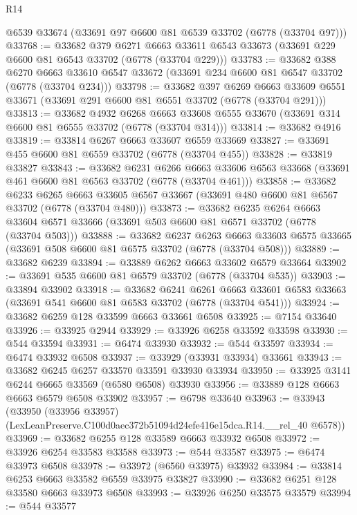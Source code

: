 \begin{lexlean}{R14}
\begin{coremodule}
    @6539
    @33674
    (@33691 @97 @6600 @81 @6539 @33702 (@6778 (@33704 @97)))
@33768 := @33682
    @379
    @6271
    @6663
    @33611
    @6543
    @33673
    (@33691 @229 @6600 @81 @6543 @33702 (@6778 (@33704 @229)))
@33783 := @33682
    @388
    @6270
    @6663
    @33610
    @6547
    @33672
    (@33691 @234 @6600 @81 @6547 @33702 (@6778 (@33704 @234)))
@33798 := @33682
    @397
    @6269
    @6663
    @33609
    @6551
    @33671
    (@33691 @291 @6600 @81 @6551 @33702 (@6778 (@33704 @291)))
@33813 := @33682
    @4932
    @6268
    @6663
    @33608
    @6555
    @33670
    (@33691 @314 @6600 @81 @6555 @33702 (@6778 (@33704 @314)))
@33814 := @33682 @4916
@33819 := @33814 @6267 @6663 @33607 @6559 @33669
@33827 := @33691 @455 @6600 @81 @6559 @33702 (@6778 (@33704 @455))
@33828 := @33819 @33827
@33843 := @33682
    @6231
    @6266
    @6663
    @33606
    @6563
    @33668
    (@33691 @461 @6600 @81 @6563 @33702 (@6778 (@33704 @461)))
@33858 := @33682
    @6233
    @6265
    @6663
    @33605
    @6567
    @33667
    (@33691 @480 @6600 @81 @6567 @33702 (@6778 (@33704 @480)))
@33873 := @33682
    @6235
    @6264
    @6663
    @33604
    @6571
    @33666
    (@33691 @503 @6600 @81 @6571 @33702 (@6778 (@33704 @503)))
@33888 := @33682
    @6237
    @6263
    @6663
    @33603
    @6575
    @33665
    (@33691 @508 @6600 @81 @6575 @33702 (@6778 (@33704 @508)))
@33889 := @33682 @6239
@33894 := @33889 @6262 @6663 @33602 @6579 @33664
@33902 := @33691 @535 @6600 @81 @6579 @33702 (@6778 (@33704 @535))
@33903 := @33894 @33902
@33918 := @33682
    @6241
    @6261
    @6663
    @33601
    @6583
    @33663
    (@33691 @541 @6600 @81 @6583 @33702 (@6778 (@33704 @541)))
@33924 := @33682 @6259 @128 @33599 @6663 @33661 @6508
@33925 := @7154 @33640
@33926 := @33925 @2944
@33929 := @33926 @6258 @33592 @33598
@33930 := @544 @33594
@33931 := @6474 @33930
@33932 := @544 @33597
@33934 := @6474 @33932 @6508
@33937 := @33929 (@33931 @33934) @33661
@33943 := @33682 @6245 @6257 @33570 @33591 @33930 @33934
@33950 := @33925 @3141 @6244 @6665 @33569 (@6580 @6508) @33930
@33956 := @33889 @128 @6663 @6663 @6579 @6508 @33902
@33957 := @6798 @33640
@33963 := @33943
    (@33950 (@33956 @33957) (LexLeanPreserve.C100d0aec372b51094d24efe416e15dca.R14.__rel_40 @6578))
@33969 := @33682 @6255 @128 @33589 @6663 @33932 @6508
@33972 := @33926 @6254 @33583 @33588
@33973 := @544 @33587
@33975 := @6474 @33973 @6508
@33978 := @33972 (@6560 @33975) @33932
@33984 := @33814 @6253 @6663 @33582 @6559 @33975 @33827
@33990 := @33682 @6251 @128 @33580 @6663 @33973 @6508
@33993 := @33926 @6250 @33575 @33579
@33994 := @544 @33577

\end{coremodule}
\end{lexlean}
